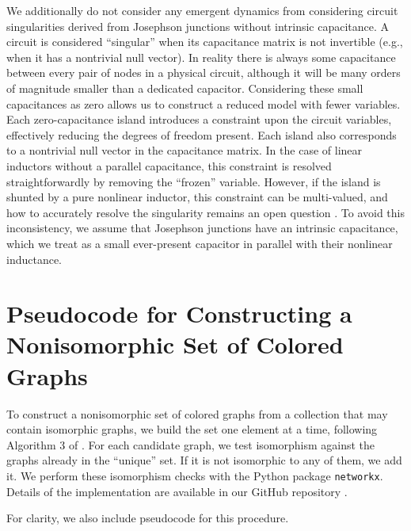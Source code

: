 We additionally do not consider any emergent dynamics from considering circuit singularities derived from Josephson junctions without intrinsic capacitance. A circuit is considered ``singular'' when its capacitance matrix is not invertible (e.g., when it has a nontrivial null vector). In reality there is always some capacitance between every pair of nodes in a physical circuit, although it will be many orders of magnitude smaller than a dedicated capacitor. Considering these small capacitances as zero allows us to construct a reduced model with fewer variables. Each zero-capacitance island introduces a constraint upon the circuit variables, effectively reducing the degrees of freedom present. Each island also corresponds to a nontrivial null vector in the capacitance matrix. In the case of linear inductors without a parallel capacitance, this constraint is resolved straightforwardly by removing the ``frozen'' variable. However, if the island is shunted by a pure nonlinear inductor, this constraint can be multi-valued, and how to accurately resolve the singularity remains an open question \cite{rymarz_consistent_2023, Eguisquiz_Reply_Consistent_2025}. To avoid this inconsistency, we assume that Josephson junctions have an intrinsic capacitance, which we treat as a small ever-present capacitor in parallel with their nonlinear inductance.


\section{Pseudocode for Constructing a Nonisomorphic Set of Colored Graphs}\label{app:psuedo}
To construct a nonisomorphic set of colored graphs from a collection that may contain isomorphic graphs, we build the set one element at a time, following Algorithm 3 of \cite{Herber:2017aa}. For each candidate graph, we test isomorphism against the graphs already in the ``unique'' set. If it is not isomorphic to any of them, we add it. We perform these isomorphism checks with the Python package \texttt{networkx}. Details of the implementation are available in our GitHub repository \cite{sircuitenum_repo}.

For clarity, we also include pseudocode for this procedure.


